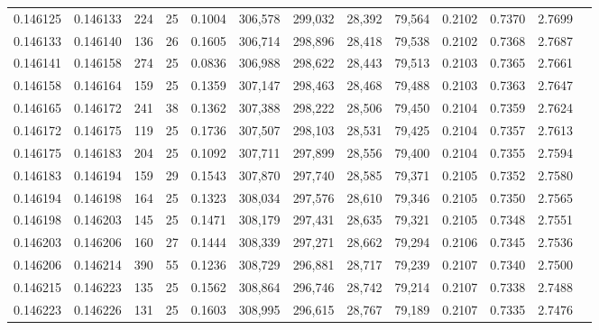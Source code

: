 \begin{tabular}{rrrrrrrrrrrrr}
0.146125 & 0.146133 & 224 &  25 &                                     0.1004 & 306,578 & 299,032 &  28,392 &  79,564 & 0.2102 & 0.7370 & 2.7699 \\
0.146133 & 0.146140 & 136 &  26 &                                     0.1605 & 306,714 & 298,896 &  28,418 &  79,538 & 0.2102 & 0.7368 & 2.7687 \\
0.146141 & 0.146158 & 274 &  25 &                                     0.0836 & 306,988 & 298,622 &  28,443 &  79,513 & 0.2103 & 0.7365 & 2.7661 \\
0.146158 & 0.146164 & 159 &  25 &                                     0.1359 & 307,147 & 298,463 &  28,468 &  79,488 & 0.2103 & 0.7363 & 2.7647 \\
0.146165 & 0.146172 & 241 &  38 &                                     0.1362 & 307,388 & 298,222 &  28,506 &  79,450 & 0.2104 & 0.7359 & 2.7624 \\
0.146172 & 0.146175 & 119 &  25 &                                     0.1736 & 307,507 & 298,103 &  28,531 &  79,425 & 0.2104 & 0.7357 & 2.7613 \\
0.146175 & 0.146183 & 204 &  25 &                                     0.1092 & 307,711 & 297,899 &  28,556 &  79,400 & 0.2104 & 0.7355 & 2.7594 \\
0.146183 & 0.146194 & 159 &  29 &                                     0.1543 & 307,870 & 297,740 &  28,585 &  79,371 & 0.2105 & 0.7352 & 2.7580 \\
0.146194 & 0.146198 & 164 &  25 &                                     0.1323 & 308,034 & 297,576 &  28,610 &  79,346 & 0.2105 & 0.7350 & 2.7565 \\
0.146198 & 0.146203 & 145 &  25 &                                     0.1471 & 308,179 & 297,431 &  28,635 &  79,321 & 0.2105 & 0.7348 & 2.7551 \\
0.146203 & 0.146206 & 160 &  27 &                                     0.1444 & 308,339 & 297,271 &  28,662 &  79,294 & 0.2106 & 0.7345 & 2.7536 \\
0.146206 & 0.146214 & 390 &  55 &                                     0.1236 & 308,729 & 296,881 &  28,717 &  79,239 & 0.2107 & 0.7340 & 2.7500 \\
0.146215 & 0.146223 & 135 &  25 &                                     0.1562 & 308,864 & 296,746 &  28,742 &  79,214 & 0.2107 & 0.7338 & 2.7488 \\
0.146223 & 0.146226 & 131 &  25 &                                     0.1603 & 308,995 & 296,615 &  28,767 &  79,189 & 0.2107 & 0.7335 & 2.7476 \\

\end{tabular}
